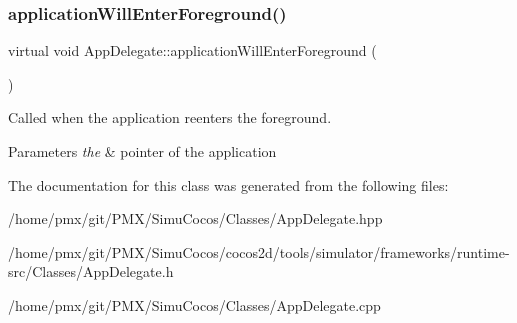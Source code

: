 \subsubsection{\texorpdfstring{application\+Will\+Enter\+Foreground()}{applicationWillEnterForeground()}\hspace{0.1cm}{\footnotesize\ttfamily [4/4]}}
{\footnotesize\ttfamily virtual void App\+Delegate\+::application\+Will\+Enter\+Foreground (\begin{DoxyParamCaption}{ }\end{DoxyParamCaption})\hspace{0.3cm}{\ttfamily [virtual]}}



Called when the application reenters the foreground. 


\begin{DoxyParams}{Parameters}
{\em the} & pointer of the application \\
\hline
\end{DoxyParams}


The documentation for this class was generated from the following files\+:\begin{DoxyCompactItemize}
\item 
/home/pmx/git/\+P\+M\+X/\+Simu\+Cocos/\+Classes/App\+Delegate.\+hpp\item 
/home/pmx/git/\+P\+M\+X/\+Simu\+Cocos/cocos2d/tools/simulator/frameworks/runtime-\/src/\+Classes/App\+Delegate.\+h\item 
/home/pmx/git/\+P\+M\+X/\+Simu\+Cocos/\+Classes/App\+Delegate.\+cpp\end{DoxyCompactItemize}
